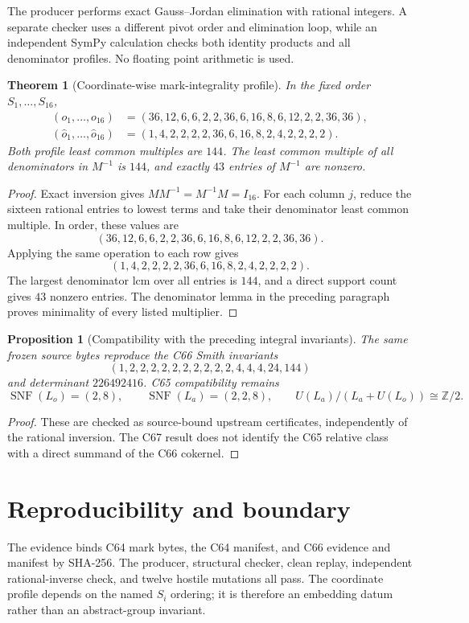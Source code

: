 \documentclass[10pt]{article}
\newtheorem{theorem}{Theorem}
\newtheorem{proposition}{Proposition}
\newcommand{\Z}{\mathbb Z}
\begin{document}
The producer performs exact Gauss--Jordan elimination with rational integers.
A separate checker uses a different pivot order and elimination loop, while
an independent SymPy calculation checks both identity products and all
denominator profiles.  No floating point arithmetic is used.

\begin{theorem}[Coordinate-wise mark-integrality profile]
In the fixed order $S_1,\ldots,S_{16}$,
\[
\begin{aligned}
(o_1,\ldots,o_{16})
  &=(36,12,6,6,2,2,36,6,16,8,6,12,2,2,36,36),\\
(\widehat o_1,\ldots,\widehat o_{16})
  &=(1,4,2,2,2,2,36,6,16,8,2,4,2,2,2,2).
\end{aligned}
\]
Both profile least common multiples are $144$.  The least common multiple of
all denominators in $M^{-1}$ is $144$, and exactly $43$ entries of $M^{-1}$
are nonzero.
\end{theorem}

\begin{proof}
Exact inversion gives $M M^{-1}=M^{-1}M=I_{16}$.  For each column $j$,
reduce the sixteen rational entries to lowest terms and take their
denominator least common multiple.  In order, these values are
\[
(36,12,6,6,2,2,36,6,16,8,6,12,2,2,36,36).
\]
Applying the same operation to each row gives
\[
(1,4,2,2,2,2,36,6,16,8,2,4,2,2,2,2).
\]
The largest denominator lcm over all entries is $144$, and a direct support
count gives $43$ nonzero entries.  The denominator lemma in the preceding
paragraph proves minimality of every listed multiplier.
\end{proof}

\begin{proposition}[Compatibility with the preceding integral invariants]
The same frozen source bytes reproduce the C66 Smith invariants
\[
(1,2,2,2,2,2,2,2,2,2,2,4,4,4,24,144)
\]
and determinant $226492416$.  C65 compatibility remains
\[
\operatorname{SNF}(L_o)=(2,8),\qquad
\operatorname{SNF}(L_a)=(2,2,8),\qquad
U(L_a)/(L_a+U(L_o))\cong\Z/2.
\]
\end{proposition}

\begin{proof}
These are checked as source-bound upstream certificates, independently of
the rational inversion.  The C67 result does not identify the C65 relative
class with a direct summand of the C66 cokernel.
\end{proof}

\section{Reproducibility and boundary}
The evidence binds C64 mark bytes, the C64 manifest, and C66 evidence and
manifest by SHA-256.  The producer, structural checker, clean replay,
independent rational-inverse check, and twelve hostile mutations all pass.
The coordinate profile depends on the named $S_i$ ordering; it is therefore
an embedding datum rather than an abstract-group invariant.
\end{document}
